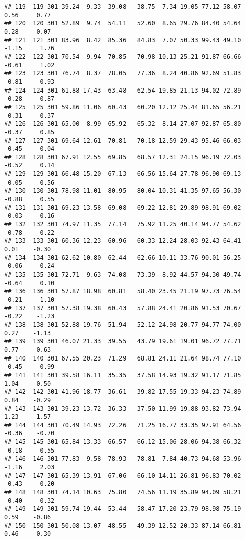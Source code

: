 \documentclass[
]{article}
\begin{document}
\begin{verbatim}
## 119  119 301 39.24  9.33  39.08   38.75  7.34 19.05 77.12 58.07  0.56     0.77
## 120  120 301 52.89  9.74  54.11   52.60  8.65 29.76 84.40 54.64  0.28     0.07
## 121  121 301 83.96  8.42  85.36   84.83  7.07 50.33 99.43 49.10 -1.15     1.76
## 122  122 301 70.54  9.94  70.85   70.98 10.13 25.21 91.87 66.66 -0.61     1.02
## 123  123 301 76.74  8.37  78.05   77.36  8.24 40.86 92.69 51.83 -0.81     0.93
## 124  124 301 61.88 17.43  63.48   62.54 19.85 21.13 94.02 72.89 -0.28    -0.87
## 125  125 301 59.86 11.06  60.43   60.20 12.12 25.44 81.65 56.21 -0.31    -0.37
## 126  126 301 65.00  8.99  65.92   65.32  8.14 27.07 92.87 65.80 -0.37     0.85
## 127  127 301 69.64 12.61  70.81   70.18 12.59 29.43 95.46 66.03 -0.45     0.04
## 128  128 301 67.91 12.55  69.85   68.57 12.31 24.15 96.19 72.03 -0.52     0.14
## 129  129 301 66.48 15.20  67.13   66.56 15.64 27.78 96.90 69.13 -0.05    -0.56
## 130  130 301 78.98 11.01  80.95   80.04 10.31 41.35 97.65 56.30 -0.88     0.55
## 131  131 301 69.23 13.58  69.08   69.22 12.81 29.89 98.91 69.02 -0.03    -0.16
## 132  132 301 74.97 11.35  77.14   75.92 11.25 40.14 94.77 54.62 -0.78     0.22
## 133  133 301 60.36 12.23  60.96   60.33 12.24 28.03 92.43 64.41  0.01    -0.30
## 134  134 301 62.62 10.80  62.44   62.66 10.11 33.76 90.01 56.25 -0.06    -0.24
## 135  135 301 72.71  9.63  74.08   73.39  8.92 44.57 94.30 49.74 -0.64     0.10
## 136  136 301 57.87 18.98  60.81   58.40 23.45 21.19 97.73 76.54 -0.21    -1.10
## 137  137 301 57.38 19.38  60.43   57.88 24.41 20.86 91.53 70.67 -0.22    -1.23
## 138  138 301 52.88 19.76  51.94   52.12 24.98 20.77 94.77 74.00  0.27    -1.13
## 139  139 301 46.07 21.33  39.55   43.79 19.61 19.01 96.72 77.71  0.77    -0.63
## 140  140 301 67.55 20.23  71.29   68.81 24.11 21.64 98.74 77.10 -0.45    -0.99
## 141  141 301 39.58 16.11  35.35   37.58 14.93 19.32 91.17 71.85  1.04     0.50
## 142  142 301 41.96 18.77  36.61   39.82 17.55 19.33 94.23 74.89  0.84    -0.29
## 143  143 301 39.23 13.72  36.33   37.50 11.99 19.88 93.82 73.94  1.23     1.57
## 144  144 301 70.49 14.93  72.26   71.25 16.77 33.35 97.91 64.56 -0.36    -0.70
## 145  145 301 65.84 13.33  66.57   66.12 15.06 28.06 94.38 66.32 -0.18    -0.55
## 146  146 301 77.83  9.58  78.93   78.81  7.84 40.73 94.68 53.96 -1.16     2.03
## 147  147 301 65.39 13.91  67.06   66.10 14.11 26.81 96.83 70.02 -0.43    -0.20
## 148  148 301 74.14 10.63  75.80   74.56 11.19 35.89 94.09 58.21 -0.40    -0.32
## 149  149 301 59.74 19.44  53.44   58.47 17.20 23.79 98.98 75.19  0.59    -0.86
## 150  150 301 50.08 13.07  48.55   49.39 12.52 20.33 87.14 66.81  0.46    -0.30

\end{verbatim}
\end{document}
